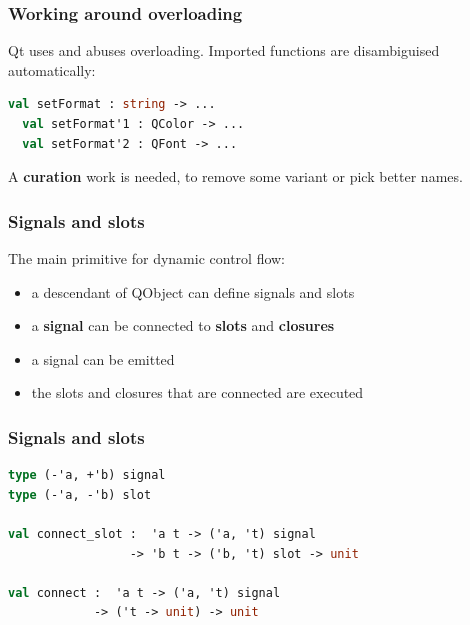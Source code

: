 \documentclass[serif,mathserif]{beamer}
\begin{document}
\begin{frame}[fragile]
  \frametitle{Working around overloading}

  Qt uses and abuses overloading.
  Imported functions are disambiguised automatically:

  \begin{lstlisting}[language=Caml,morekeywords={module,sig,end,val}]
  val setFormat : string -> ...
  val setFormat'1 : QColor -> ...
  val setFormat'2 : QFont -> ...
  \end{lstlisting}

  A {\bf curation} work is needed, to remove some variant or pick better names.
\end{frame}

\begin{frame}
  \frametitle{Signals and slots}

  The main primitive for dynamic control flow:

  \begin{itemize}
    \item a descendant of QObject can define signals and slots
    \item a {\bf signal} can be connected to {\bf slots} and {\bf closures}
    \item a signal can be emitted
    \item the slots and closures that are connected are executed
  \end{itemize}
\end{frame}

\begin{frame}[fragile]
  \frametitle{Signals and slots}

\begin{lstlisting}[language=Caml,morekeywords={module,sig,end,val}]
type (-'a, +'b) signal
type (-'a, -'b) slot

val connect_slot :  'a t -> ('a, 't) signal 
                 -> 'b t -> ('b, 't) slot -> unit

val connect :  'a t -> ('a, 't) signal 
            -> ('t -> unit) -> unit
\end{lstlisting}

\end{frame}
\end{document}
